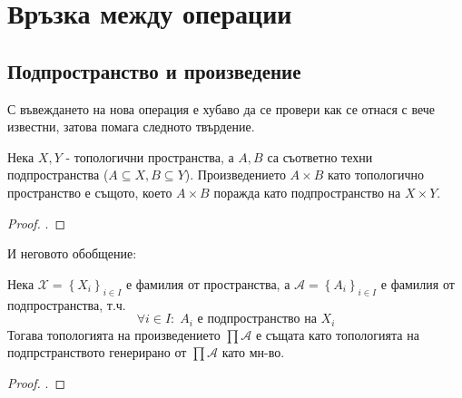\section{Връзка между операции}
\subsection{Подпространство и произведение}
С въвеждането на нова операция е хубаво да се провери как се отнася с вече известни, затова помага следното твърдение.
\begin{proposition}
    Нека $X, Y$ - топологични пространства, а $A, B$ са съответно техни подпространства ($A \subseteq X, B \subseteq Y$). Произведението $A \times B$ като топологично пространство е същото, което $A \times B$ поражда като подпространство на $X \times Y$.
\end{proposition}
\begin{proof}
    \cite[стр.~87]{munkrestopology}.
\end{proof}
И неговото обобщение:
\begin{proposition}
    Нека $\mathcal X = \left\{X_i\right\}_{i\in I}$ е фамилия от пространства, а $\mathcal A = \left\{A_i\right\}_{i\in I}$ е фамилия от подпространства, т.ч.
    \begin{equation}
        \forall i \in I:\; A_i \text{ е подпространство на } X_i
    \end{equation}
    Тогава топологията на произведението $\prod \mathcal A$ е същата като топологията на подпрстранството генерирано от $\prod \mathcal A$ като мн-во.
\end{proposition}
\begin{proof}
    \cite[стр.~78]{engelking1989general}.
\end{proof}

